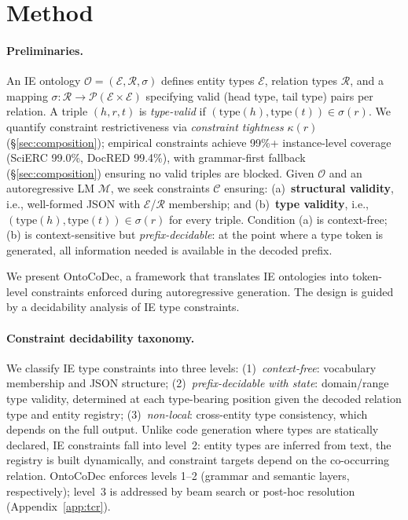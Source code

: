 
\section{Method}
\label{sec:method}



\paragraph{Preliminaries.}
\label{sec:preliminaries}
An IE ontology $\mathcal{O} = (\mathcal{E}, \mathcal{R}, \sigma)$ defines entity types $\mathcal{E}$, relation types $\mathcal{R}$, and a mapping $\sigma: \mathcal{R} \to \mathcal{P}(\mathcal{E} \times \mathcal{E})$ specifying valid (head type, tail type) pairs per relation.
A triple $(h, r, t)$ is \emph{type-valid} if $(\mathrm{type}(h), \mathrm{type}(t)) \in \sigma(r)$.
We quantify constraint restrictiveness via \emph{constraint tightness} $\kappa(r)$ (\S\ref{sec:composition}); empirical constraints achieve 99\%+ instance-level coverage (SciERC 99.0\%, DocRED 99.4\%), with grammar-first fallback (\S\ref{sec:composition}) ensuring no valid triples are blocked.
Given $\mathcal{O}$ and an autoregressive LM $\mathcal{M}$, we seek constraints $\mathcal{C}$ ensuring: (a)~\textbf{structural validity}, i.e., well-formed JSON with $\mathcal{E}$/$\mathcal{R}$ membership; and (b)~\textbf{type validity}, i.e., $(\mathrm{type}(h), \mathrm{type}(t)) \in \sigma(r)$ for every triple.
Condition (a) is context-free; (b) is context-sensitive but \emph{prefix-decidable}: at the point where a type token is generated, all information needed is available in the decoded prefix.

\smallskip
\noindent
We present OntoCoDec, a framework that translates IE ontologies into token-level constraints enforced during autoregressive generation.
The design is guided by a decidability analysis of IE type constraints.

\paragraph{Constraint decidability taxonomy.}
\label{sec:decidability}
We classify IE type constraints into three levels: (1)~\emph{context-free}: vocabulary membership and JSON structure; (2)~\emph{prefix-decidable with state}: domain/range type validity, determined at each type-bearing position given the decoded relation type and entity registry; (3)~\emph{non-local}: cross-entity type consistency, which depends on the full output.
Unlike code generation where types are statically declared, IE constraints fall into level~2: entity types are inferred from text, the registry is built dynamically, and constraint targets depend on the co-occurring relation.
OntoCoDec enforces levels 1--2 (grammar and semantic layers, respectively); level~3 is addressed by beam search or post-hoc resolution (Appendix~\ref{app:tcr}).

